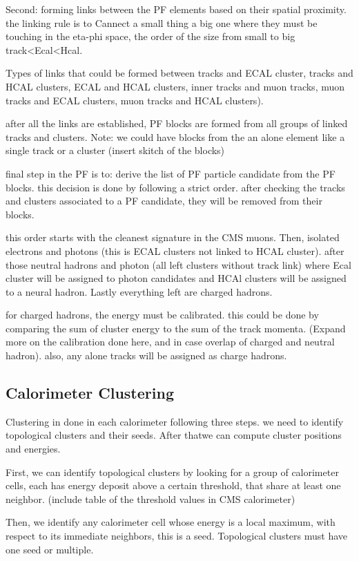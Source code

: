 Second: forming links between the PF elements based on their spatial proximity. the linking rule is to Cannect a small thing a big one where they must be touching in the eta-phi space, the order of the size from small to big track<Ecal<Hcal.

Types of links that could be formed between tracks and ECAL cluster, tracks and HCAL clusters, ECAL and HCAL clusters, inner tracks and muon tracks, muon tracks and ECAL clusters, muon tracks and HCAL clusters).  

after all the links are established, PF blocks are formed from all groups of linked tracks and clusters. Note: we could have blocks from the an alone element like a single track or a cluster (insert skitch of the blocks)

final step in the PF is to:  derive the list of PF particle candidate from the PF blocks. this decision is done by following a strict order. after checking the tracks and clusters associated to a PF candidate, they will be removed from their blocks.  

this order starts with the cleanest signature in the CMS muons. Then, isolated electrons and photons (this is ECAL clusters not linked to HCAL cluster). after those neutral hadrons and photon (all left clusters without track link) where Ecal cluster will be assigned to photon candidates and HCAl clusters will be assigned to a neural hadron. Lastly everything left are charged hadrons.

for charged hadrons, the energy must be calibrated. this could be done by comparing the sum of cluster energy to the sum of the track momenta. (Expand more on the calibration done here, and in case overlap of charged and neutral hadron). also, any alone tracks will be assigned as charge hadrons.

\subsection{Calorimeter Clustering}

Clustering in done in each calorimeter following three steps. we need to identify topological clusters and their seeds. After thatwe can compute cluster positions and energies.

First, we can identify topological clusters by looking for a group of calorimeter cells, each has energy deposit above a certain threshold, that share at least one neighbor. (include table of the threshold values in CMS calorimeter)

Then, we identify any calorimeter cell whose energy is a local maximum, with respect to its immediate neighbors, this is a seed. Topological clusters must have one seed or multiple.

